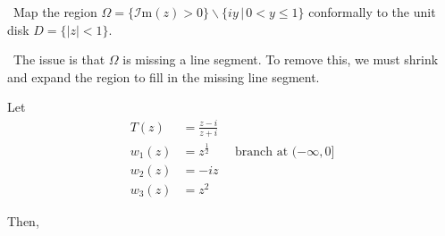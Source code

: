\documentclass[12pt]{Homework}
\newcommand{\im}{\mathscr{I}\text{m}}
\begin{document}
\begin{problem} $\,$
Map the region $\Omega=\{\im(z)>0\}\backslash\{iy\,|\,0<y\le 1\}$ conformally to the unit disk $D=\{|z|<1\}$.
\end{problem}


\begin{solution}$\,$
The issue is that $\Omega$ is missing a line segment. To remove this, we must shrink and expand the region to fill in the missing line segment.

Let \begin{align*}
    T(z)&=\frac{z-i}{z+i}\\
    w_1(z)&=z^\frac{1}{2}\qquad\text{branch at }(-\infty,0]\\
    w_2(z)&=-iz\\
    w_3(z)&=z^2
\end{align*}

Then,


\end{solution}
\end{document}
